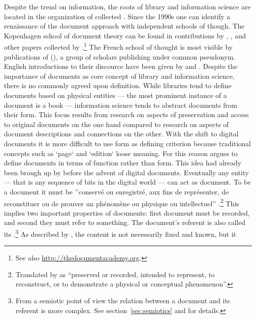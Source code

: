 Despite the trend on information, the roots of library and information science
are located in the organization of collected . Since
the 1990s one can identify a renaissance of the document approach with
independent schools of though. The Kopenhagen school of document theory can be
found in contributions by \textcite{Lund2009}, \textcite{Hjorland2007},
\textcite{Orom2007} and other papers collected by
\textcite{Skare2007}.\footnote{See also \url{http://thedocumentacademy.org}.}
The French school of thought is most visible by publications of 
(\citeyear{Pedauque2003,Pedauque2006,Pedauque2007,Pedauque2011}), a
group of scholars publishing under common pseudonym. English introductions to
their discource have been given by \textcite{Truex2007} and
\textcite{Gradmann2008}.  Despite the importance of documents as core concept
of library and information science, there is no commonly agreed upon
definition. While libraries tend to define documents based on physical
entities --- the most prominent instance of a document is a book ---
information science tends to abstract documents from their form. This focus
results from research on aspects of preservation and access to original
documents on the one hand compared to research on aspects of document
descriptions and connections on the other. With the shift to digital documents
it is more difficult to use form as defining criterion because traditional
concepts such as `page` and `edition` loose meaning. For this reason
\textcite{Buckland1997,Buckland1998} argues to define documents in terms of
function rather than form. This idea had already been brough up by
\textcite{Briet1951} before the advent of digital documents.  Eventually any
entity --- that is any sequence of bits in the digital world --- can act as
document. To be a document it must be ''conserv\'e ou enregistr\'e, aux fins de
repr\'esenter, de reconstituer ou de prouver un ph\'enom\`ene ou physique ou
intellectuel'' \cite[p. 7]{Briet1951}.\footnote{Translated by
\textcite{Buckland1997} as ``preserved or recorded, intended to represent, to
reconstruct, or to demonstrate a physical or conceptual phenomenon''.} This
implies two important properties of documents: first document must be recorded,
and second they must refer to something. The document's referent is also called
its .\footnote{From a semiotic point of view the relation between
a document and its referent is more complex. See section~\ref{sec:semiotics}
and \textcite{Brier2008,Brier2006} for details.} As described by
\textcite{Yeo2010}, the content is not necessarily fixed and known, but it
